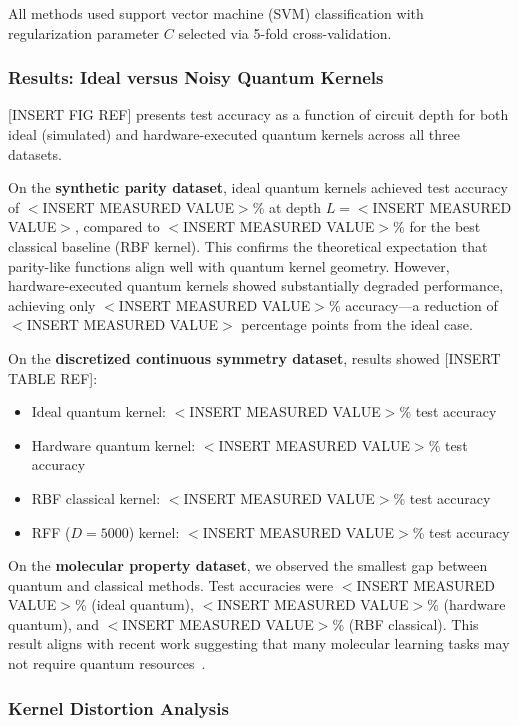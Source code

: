 \documentclass[aps,prb,reprint,superscriptaddress,showpacs]{revtex4-2}
\begin{document}
All methods used support vector machine (SVM) classification with regularization parameter $C$ selected via 5-fold cross-validation.

\subsubsection{Results: Ideal versus Noisy Quantum Kernels}

[INSERT FIG REF] presents test accuracy as a function of circuit depth for both ideal (simulated) and hardware-executed quantum kernels across all three datasets.

On the \textbf{synthetic parity dataset}, ideal quantum kernels achieved test accuracy of $<$INSERT MEASURED VALUE$>$\% at depth $L = <$INSERT MEASURED VALUE$>$, compared to $<$INSERT MEASURED VALUE$>$\% for the best classical baseline (RBF kernel). This confirms the theoretical expectation that parity-like functions align well with quantum kernel geometry. However, hardware-executed quantum kernels showed substantially degraded performance, achieving only $<$INSERT MEASURED VALUE$>$\% accuracy---a reduction of $<$INSERT MEASURED VALUE$>$ percentage points from the ideal case.

On the \textbf{discretized continuous symmetry dataset}, results showed [INSERT TABLE REF]:
\begin{itemize}
    \item Ideal quantum kernel: $<$INSERT MEASURED VALUE$>$\% test accuracy
    \item Hardware quantum kernel: $<$INSERT MEASURED VALUE$>$\% test accuracy  
    \item RBF classical kernel: $<$INSERT MEASURED VALUE$>$\% test accuracy
    \item RFF ($D=5000$) kernel: $<$INSERT MEASURED VALUE$>$\% test accuracy
\end{itemize}

On the \textbf{molecular property dataset}, we observed the smallest gap between quantum and classical methods. Test accuracies were $<$INSERT MEASURED VALUE$>$\% (ideal quantum), $<$INSERT MEASURED VALUE$>$\% (hardware quantum), and $<$INSERT MEASURED VALUE$>$\% (RBF classical). This result aligns with recent work suggesting that many molecular learning tasks may not require quantum resources~\cite{Huang2022ProvablyEfficient}.

\subsubsection{Kernel Distortion Analysis}
\end{document}
